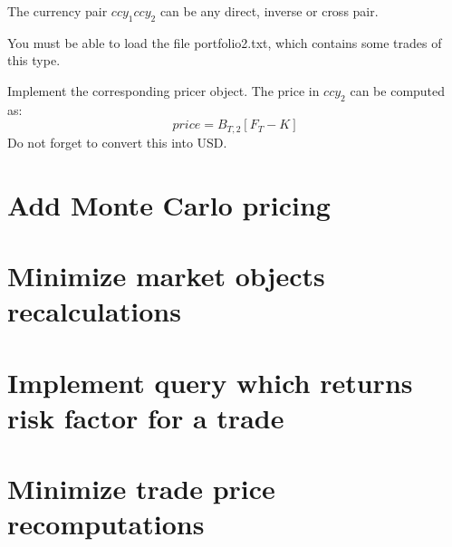 \documentclass[10pt]{article}
\begin{document}
The currency pair $ccy_1ccy_2$ can be any direct, inverse or cross pair.

You must be able to load the file portfolio2.txt, which contains some trades of this type.

Implement the corresponding pricer object. The price in $ccy_2$ can be computed as:
$$
price=B_{T,2}[F_T-K]
$$
Do not forget to convert this into USD.

\section{Add Monte Carlo pricing}

\section{Minimize market objects recalculations}

\section{Implement query which returns risk factor for a trade}

\section{Minimize trade price recomputations}
\end{document}
